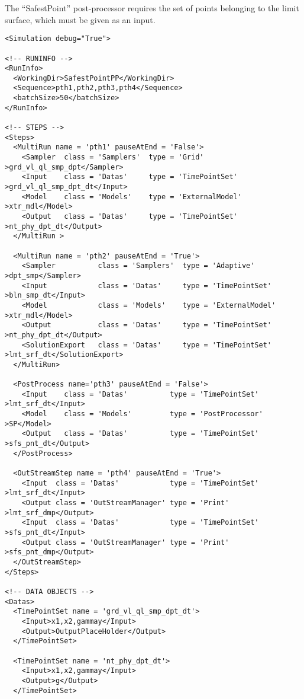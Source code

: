 The ``SafestPoint'' post-processor requires the set of points belonging to the
limit surface, which must be given as an input.

\begin{lstlisting}[style=XML,morekeywords={debug,re,seeding,class,subType,limit}]
<Simulation debug="True">

<!-- RUNINFO -->
<RunInfo>
  <WorkingDir>SafestPointPP</WorkingDir>
  <Sequence>pth1,pth2,pth3,pth4</Sequence>
  <batchSize>50</batchSize>
</RunInfo>

<!-- STEPS -->
<Steps>  
  <MultiRun name = 'pth1' pauseAtEnd = 'False'>
    <Sampler  class = 'Samplers'  type = 'Grid'           >grd_vl_ql_smp_dpt</Sampler>
    <Input    class = 'Datas'     type = 'TimePointSet'   >grd_vl_ql_smp_dpt_dt</Input>
    <Model    class = 'Models'    type = 'ExternalModel'  >xtr_mdl</Model>
    <Output   class = 'Datas'     type = 'TimePointSet'   >nt_phy_dpt_dt</Output>    
  </MultiRun >
  
  <MultiRun name = 'pth2' pauseAtEnd = 'True'>
    <Sampler          class = 'Samplers'  type = 'Adaptive'      >dpt_smp</Sampler>
    <Input            class = 'Datas'     type = 'TimePointSet'  >bln_smp_dt</Input>   
    <Model            class = 'Models'    type = 'ExternalModel' >xtr_mdl</Model>
    <Output           class = 'Datas'     type = 'TimePointSet'  >nt_phy_dpt_dt</Output>            
    <SolutionExport   class = 'Datas'     type = 'TimePointSet'  >lmt_srf_dt</SolutionExport>
  </MultiRun>
  
  <PostProcess name='pth3' pauseAtEnd = 'False'>
    <Input    class = 'Datas'          type = 'TimePointSet'       >lmt_srf_dt</Input>
    <Model    class = 'Models'         type = 'PostProcessor'  >SP</Model>
    <Output   class = 'Datas'          type = 'TimePointSet'     >sfs_pnt_dt</Output>
  </PostProcess>  
  
  <OutStreamStep name = 'pth4' pauseAtEnd = 'True'>
  	<Input  class = 'Datas'            type = 'TimePointSet'  >lmt_srf_dt</Input>
  	<Output class = 'OutStreamManager' type = 'Print'         >lmt_srf_dmp</Output>
    <Input  class = 'Datas'            type = 'TimePointSet'  >sfs_pnt_dt</Input>
  	<Output class = 'OutStreamManager' type = 'Print'         >sfs_pnt_dmp</Output>
  </OutStreamStep>
</Steps>

<!-- DATA OBJECTS -->
<Datas> 
  <TimePointSet name = 'grd_vl_ql_smp_dpt_dt'>
    <Input>x1,x2,gammay</Input>
    <Output>OutputPlaceHolder</Output>
  </TimePointSet>
  
  <TimePointSet name = 'nt_phy_dpt_dt'>
    <Input>x1,x2,gammay</Input>
    <Output>g</Output>
  </TimePointSet>
    

\end{lstlisting}
